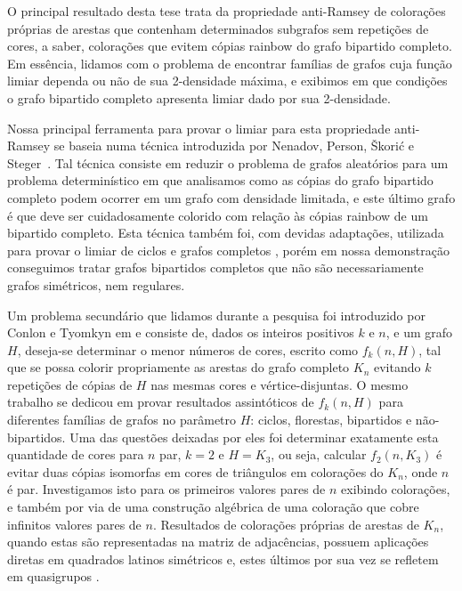 \documentclass[12pt,a4paper]{book}
\begin{document}
O principal resultado desta tese trata da propriedade anti-Ramsey de colorações próprias de arestas que contenham determinados subgrafos sem repetições de cores, a saber, colorações que evitem cópias rainbow do grafo bipartido completo.
Em essência, lidamos com o problema de encontrar famílias de grafos cuja função limiar dependa ou não de sua 2-densidade máxima, e exibimos em que condições o grafo bipartido completo apresenta limiar dado por sua 2-densidade.

Nossa principal ferramenta para provar o limiar para esta propriedade anti-Ramsey se baseia numa técnica introduzida por 
Nenadov, Person, Škorić e Steger~\cite{NePeSkSt14}.
Tal técnica consiste em reduzir o problema de grafos aleatórios para um problema determinístico em que analisamos como as cópias do grafo bipartido completo podem ocorrer em um grafo com densidade limitada, e este último grafo é que deve ser cuidadosamente colorido com relação às cópias rainbow de um bipartido completo. 
Esta técnica também foi, com devidas adaptações, utilizada para provar o limiar de ciclos \cite{barros2021anti, NePeSkSt14} e grafos completos \cite{kohayakawa2019anti, NePeSkSt14}, porém em nossa demonstração conseguimos tratar grafos bipartidos completos que não são necessariamente grafos simétricos, nem regulares.  


Um problema secundário que lidamos durante a pesquisa foi introduzido por Conlon e Tyomkyn em \cite{conlontyomkyn}
e consiste de, dados os inteiros positivos $k$ e $n$, e um grafo $H$, deseja-se determinar o menor números de cores, escrito como $f_k(n,H)$, 
tal que se possa colorir propriamente as arestas do grafo completo $K_n$ evitando $k$ repetições de cópias de $H$ nas mesmas cores e vértice-disjuntas.
O mesmo trabalho se dedicou em provar resultados assintóticos de $f_k(n,H)$ para diferentes famílias de grafos no parâmetro $H$: ciclos, florestas, bipartidos e não-bipartidos.
Uma das questões deixadas por eles 
 foi determinar exatamente esta quantidade de cores para $n$ par, $k=2$ e $H = K_3$, ou seja, calcular $f_2(n, K_3)$ é evitar duas cópias isomorfas em cores de triângulos em colorações do $K_n$, onde $n$ é par.
 Investigamos isto para os primeiros valores pares de $n$ exibindo colorações, e também por via de uma construção algébrica de uma coloração que cobre infinitos valores pares de $n$.
 Resultados de colorações próprias de arestas de $K_n$, quando estas são representadas na matriz de adjacências, possuem aplicações diretas em quadrados latinos simétricos e, estes últimos por sua vez se refletem em quasigrupos \cite{andersen1994symmetric}.
 
\end{document}
